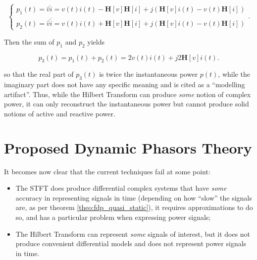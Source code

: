 \begin{equation}\left\{\begin{array}{l} p_1(t) = \hat{v}\hat{i} = v(t)i(t) - \mathbf{H}\left[v\right]\mathbf{H}\left[i\right] + j\left( \mathbf{H}\left[v\right]i(t) - v(t)\mathbf{H}\left[i\right]\right) \\[3mm] p_2(t) = \hat{v}\overline{\hat{i}} = v(t)i(t) + \mathbf{H}\left[v\right]\mathbf{H}\left[i\right] + j\left( \mathbf{H}\left[v\right]i(t) - v(t)\mathbf{H}\left[i\right]\right)\end{array}\right. .\end{equation}

	Then the sum of $p_1$ and $p_2$ yields

\begin{equation} p_3(t) = p_1(t) + p_2(t) = 2v(t)i(t) + j2\mathbf{H}\left[v\right]i(t) .\end{equation}

	\noindent so that the real part of $p_3(t)$ is twice the instantaneous power $p(t)$, while the imaginary part does not have any specific meaning and is cited as a ``modelling artifact''. Thus, while the Hilbert Transform can produce \textit{some} notion of complex power, it can only reconstruct the instantaneous power but cannot produce solid notions of active and reactive power.

\section{Proposed Dynamic Phasors Theory} \label{sec:proposed_dptheory} %

	It becomes now clear that the current techniques fail at some point:

\begin{itemize}
	\item The STFT does produce differential complex systems that have \textit{some} accuracy in representing signals in time (depending on how ``slow'' the signals are, as per theorem \ref{theo:fdp_quasi_static}), it requires approximations to do so, and has a particular problem when expressing power signals;
	\item The Hilbert Transform can represent \textit{some} signals of interest, but it does not produce convenient differential models and does not represent power signals in time.
\end{itemize}


